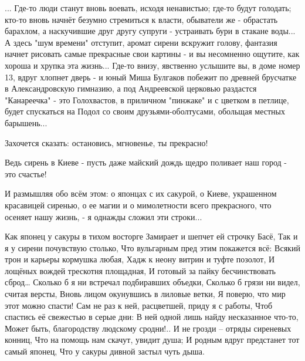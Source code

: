 ... Где-то люди станут вновь воевать, исходя ненавистью; где-то будут голодать;
кто-то вновь начнёт безумно стремиться к власти, обыватели же - обрастать
барахлом, а наскучившие друг другу супруги - устраивать бури в стакане воды...
А здесь "шум времени" отступит, аромат сирени вскружит голову, фантазия начнет
рисовать самые прекрасные свои картины - и вы несомненно ощутите, как хороша и
хрупка эта жизнь... Где-то внизу,  явственно услышите вы, в доме номер 13,
вдруг хлопнет  дверь - и юный Миша Булгаков побежит по древней брусчатке в
Александровскую гимназию, а под Андреевской церковью раздастся  "Канареечка" -
это Голохвастов, в приличном "пинжаке" и с цветком в петлице, будет спускаться
на Подол со своим друзьями-оболтусами, обольщая местных барышень...

Захочется сказать: остановись, мгновенье, ты прекрасно!

Ведь сирень в Киеве - пусть даже майский дождь щедро поливает наш город - это счастье!

И размышляя обо всём этом: о японцах с их сакурой, о Киеве, украшенном
красавицей сиренью, о ее магии и о мимолетности всего прекрасного, что осеняет
нашу жизнь, - я однажды сложил эти строки...

Как японец у сакуры в тихом восторге
Замирает и шепчет ей строчку Басё,
Так и я у сирени почувствую столько,
Что вульгарным пред этим покажется всё:
Всякий трон и карьеры кормушка любая,
Хадж к неону витрин и туфте позолот,
И лощёных вождей трескотня площадная,
И готовый за пайку бесчинствовать сброд…
Сколько б я ни встречал подбиравших объедки,
Сколько б грязи ни видел, считая версты,
Вновь лицом окунувшись в лиловые ветки,
Я поверю, что мир этот можно спасти!
Сам не раз к ней, расцветшей, приду я с работы,
Чтоб спастись её свежестью в серые дни:
В ней одной лишь найду несказанное что-то,
Может быть, благородству людскому сродни!..
И не грозди – отряды сиреневых конниц,
Что на помощь нам скачут, увидит душа;
И родным вдруг предстанет тот самый японец,
Что у сакуры дивной застыл чуть дыша.
